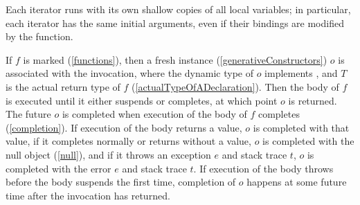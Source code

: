 \documentclass[makeidx]{article}
\begin{document}

\LMHash{}%
Each iterator runs with its own shallow copies of all local variables; in particular, each iterator has the same initial arguments, even if their bindings are modified by the function.

\LMHash{}%
If $f$ is marked \ASYNC{} (\ref{functions}),
then a fresh instance (\ref{generativeConstructors}) $o$ is associated with the invocation,
where the dynamic type of $o$ implements ,
and $T$ is the actual return type of $f$ (\ref{actualTypeOfADeclaration}).
Then the body of $f$ is executed until it either suspends or completes, at which point $o$ is returned.
The future $o$ is completed when execution of the body of $f$ completes (\ref{completion}).
If execution of the body returns a value, $o$ is completed with that value,
if it completes normally or returns without a value,
$o$ is completed with the null object (\ref{null}),
and if it throws an exception $e$ and stack trace $t$,
$o$ is completed with the error $e$ and stack trace $t$.
If execution of the body throws before the body suspends the first time,
completion of $o$ happens at some future time after the invocation has returned.
\end{document}
